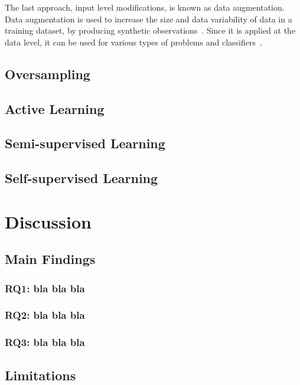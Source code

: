 \documentclass[parskip=full]{scrartcl}
\begin{document}
The last approach, input level modifications, is known as data augmentation.
Data augmentation is used to increase the size and data variability of data in
a training dataset, by producing synthetic observations~\cite{Van2001,
Wong2016}. Since it is applied at the data level, it can be used for various
types of problems and classifiers~\cite{Behpour2019}. 

\subsection{Oversampling}

\subsection{Active Learning}

\subsection{Semi-supervised Learning}

\subsection{Self-supervised Learning}

\section{Discussion}

\subsection{Main Findings}

\subsubsection{RQ1: bla bla bla}

\subsubsection{RQ2: bla bla bla}

\subsubsection{RQ3: bla bla bla}

\subsection{Limitations}
\end{document}
